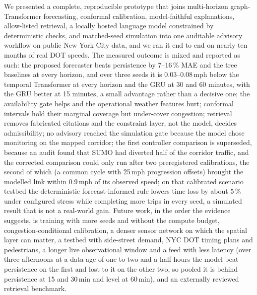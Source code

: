 We presented a complete, reproducible prototype that joins multi-horizon graph-Transformer forecasting, conformal
calibration, model-faithful explanations, allow-listed retrieval, a locally hosted language model constrained by
deterministic checks, and matched-seed simulation into one auditable advisory workflow on public New York City data,
and we ran it end to end on nearly ten months of real DOT speeds. The measured outcome is mixed and reported as such: the
proposed forecaster beats persistence by 7--16\,\% MAE and the tree baselines at every horizon, and over three seeds
it is 0.03--0.08\,mph below the temporal Transformer at every horizon and the GRU at 30 and 60 minutes, with the GRU
better at 15 minutes, a small advantage rather than a decisive one; the availability gate helps and the operational weather
features hurt; conformal intervals hold their marginal coverage but under-cover congestion; retrieval removes
fabricated citations and the constraint layer, not the model, decides admissibility; no advisory reached the
simulation gate because the model chose monitoring on the mapped corridor; the first controller comparison is
superseded, because an audit found that SUMO had diverted half of the corridor traffic, and the corrected comparison
could only run after two preregistered calibrations, the second of which (a common cycle with 25\,mph progression
offsets) brought the modelled link within 0.9\,mph of its observed speed; on that calibrated scenario testbed the
deterministic forecast-informed rule lowers time loss by about 5\,\% under configured stress while completing more
trips in every seed, a simulated result that is not a real-world gain. Future work, in the order the evidence suggests,
is training with more seeds and without the compute budget, congestion-conditional calibration, a denser sensor network
on which the spatial layer can matter, a testbed with side-street demand, NYC DOT timing plans and pedestrians, a longer
live observational window and a feed with less latency (over three afternoons at a data age of one to two and a
half hours the model beat persistence on the first and lost to it on the other two, so pooled it is behind persistence
at 15 and 30\,min and level at 60\,min),
and an externally reviewed retrieval benchmark.
